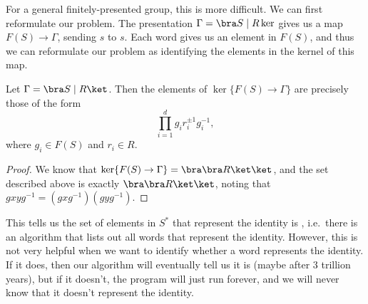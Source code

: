 \documentclass[a4paper]{article}
\begin{document}
For a general finitely-presented group, this is more difficult. We can first reformulate our problem. The presentation $\Gamma = \bra S \mid R \ker$ gives us a map $F(S) \to \Gamma$, sending $s$ to $s$. Each word gives us an element in $F(S)$, and thus we can reformulate our problem as identifying the elements in the kernel of this map.

\begin{lemma}
  Let $\Gamma = \bra S \mid R\ket$. Then the elements of $\ker \{F(S) \to \Gamma\}$ are precisely those of the form
  \[
    \prod_{i = 1}^d g_i r_i^{\pm 1} g_i^{-1},
  \]
  where $g_i \in F(S)$ and $r_i \in R$.
\end{lemma}

\begin{proof}
  We know that $\ker \{F(S) \to \Gamma\} = \bra \bra R\ket \ket$, and the set described above is exactly $\bra \bra R\ket \ket$, noting that $gxyg^{-1} = (gxg^{-1})(gyg^{-1})$.
\end{proof}

This tells us the set of elements in $S^*$ that represent the identity is , i.e.\ there is an algorithm that lists out all words that represent the identity. However, this is not very helpful when we want to identify whether a word represents the identity. If it does, then our algorithm will eventually tell us it is (maybe after 3 trillion years), but if it doesn't, the program will just run forever, and we will never know that it doesn't represent the identity.
\end{document}
